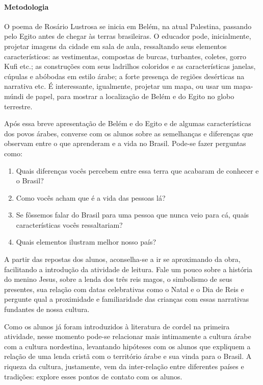 \documentclass[11pt]{extarticle}
\begin{document}
\paragraph{Metodologia} O poema de Rosário Lustrosa se inicia em Belém, na atual Palestina, passando pelo Egito antes de chegar às terras brasileiras. O educador pode, inicialmente, projetar imagens da cidade em sala de aula, ressaltando seus elementos característicos: as vestimentas, compostas de burcas, turbantes, coletes, gorro Kufi etc.; as construções com seus ladrilhos coloridos e as características janelas, cúpulas e abóbodas em estilo árabe; a forte presença de regiões desérticas na narrativa etc. É interessante, igualmente, projetar um mapa, ou usar um mapa-múndi de papel, para mostrar a localização de Belém e do Egito no globo terrestre. 

Após essa breve apresentação de Belém e do Egito e de algumas características dos povos árabes, converse com os alunos sobre as semelhanças e diferenças que observam entre o que aprenderam e a vida no Brasil. 
Pode-se fazer perguntas como:

\begin{enumerate}
\item Quais diferenças vocês percebem entre essa terra que acabaram de conhecer e o Brasil?

\item Como vocês acham que é a vida das pessoas lá? 

\item Se fôssemos falar do Brasil para uma pessoa que nunca veio para cá, quais características vocês ressaltariam?

\item Quais elementos ilustram melhor nosso país?

\end{enumerate}

A partir das repostas dos alunos, aconselha-se a ir se aproximando da obra, facilitando a introdução da atividade de leitura. Fale um pouco sobre a história do menino Jesus, sobre a lenda dos três reis magos, o simbolismo de seus presentes, sua relação com datas celebrativas como o Natal e o Dia de Reis e pergunte qual a proximidade e familiaridade das crianças com essas narrativas fundantes de nossa cultura.

Como os alunos já foram introduzidos à literatura de cordel na primeira atividade, nesse momento pode-se relacionar mais intimamente a cultura árabe com a cultura nordestina, levantando hipóteses com os alunos que expliquem a relação de uma lenda cristã com o território árabe e sua vinda para o Brasil. A riqueza da cultura, justamente, vem da inter-relação entre diferentes países e tradições: explore esses pontos de contato com os alunos.
\end{document}
